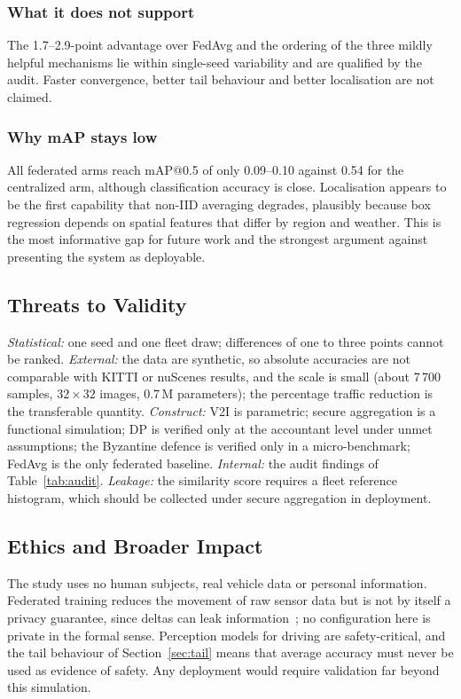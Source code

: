 \documentclass[journal]{IEEEtran}
\begin{document}
\subsubsection*{What it does not support}
The 1.7--2.9-point advantage over FedAvg and the ordering of the three mildly helpful mechanisms lie within single-seed variability and are qualified by the audit. Faster convergence, better tail behaviour and better localisation are not claimed.

\subsubsection*{Why mAP stays low}
All federated arms reach mAP@0.5 of only 0.09--0.10 against 0.54 for the centralized arm, although classification accuracy is close. Localisation appears to be the first capability that non-IID averaging degrades, plausibly because box regression depends on spatial features that differ by region and weather. This is the most informative gap for future work and the strongest argument against presenting the system as deployable.

\subsection{Threats to Validity}\label{sec:limits}
\emph{Statistical:} one seed and one fleet draw; differences of one to three points cannot be ranked. \emph{External:} the data are synthetic, so absolute accuracies are not comparable with KITTI or nuScenes results, and the scale is small (about 7\,700 samples, $32\times32$ images, 0.7\,M parameters); the percentage traffic reduction is the transferable quantity. \emph{Construct:} V2I is parametric; secure aggregation is a functional simulation; DP is verified only at the accountant level under unmet assumptions; the Byzantine defence is verified only in a micro-benchmark; FedAvg is the only federated baseline. \emph{Internal:} the audit findings of Table~\ref{tab:audit}. \emph{Leakage:} the similarity score requires a fleet reference histogram, which should be collected under secure aggregation in deployment.

\subsection{Ethics and Broader Impact}
The study uses no human subjects, real vehicle data or personal information. Federated training reduces the movement of raw sensor data but is not by itself a privacy guarantee, since deltas can leak information~\cite{zhu2019dlg}; no configuration here is private in the formal sense. Perception models for driving are safety-critical, and the tail behaviour of Section~\ref{sec:tail} means that average accuracy must never be used as evidence of safety. Any deployment would require validation far beyond this simulation.
\end{document}
